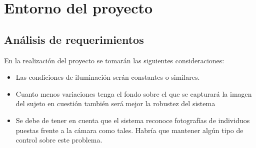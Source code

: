 \chapter{Entorno del proyecto}

\section{Análisis de requerimientos}
En la realización del proyecto se tomarán las siguientes consideraciones:
\begin{itemize}
	\item{Las condiciones de iluminación serán constantes o similares.}
	\item{Cuanto menos variaciones tenga el fondo sobre el que se capturará la imagen del sujeto en cuestión también será mejor la robustez del sistema}
	\item{Se debe de tener en cuenta que el sistema reconoce fotografías de individuos puestas frente a la cámara como tales. Habría que mantener algún tipo de control sobre este problema.}
\end{itemize}
	
